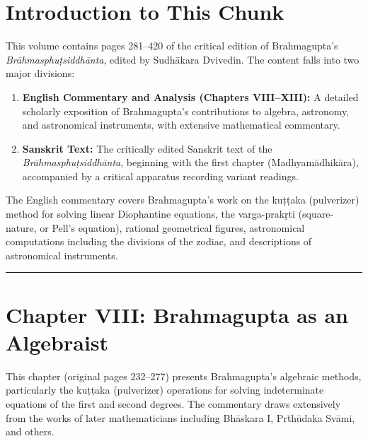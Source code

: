 \documentclass[11pt,a4paper]{article}
\newcommand{\longline}{\noindent\rule{\textwidth}{0.4pt}}
\theoremstyle{definition}
\begin{document}
\section*{Introduction to This Chunk}

This volume contains pages 281--420 of the critical edition of Brahmagupta's \textit{Br\=ahmasphu\d{t}siddh\=anta}, edited by Sudh\=akara Dvivedin. The content falls into two major divisions:

\begin{enumerate}
  \item \textbf{English Commentary and Analysis (Chapters VIII--XIII):} A detailed scholarly exposition of Brahmagupta's contributions to algebra, astronomy, and astronomical instruments, with extensive mathematical commentary.
  
  \item \textbf{Sanskrit Text:} The critically edited Sanskrit text of the \textit{Br\=ahmasphu\d{t}siddh\=anta}, beginning with the first chapter (Madhyam\=adhik\=ara), accompanied by a critical apparatus recording variant readings.
\end{enumerate}

The English commentary covers Brahmagupta's work on the ku\d{t}\d{t}aka (pulverizer) method for solving linear Diophantine equations, the varga-prak\d{r}ti (square-nature, or Pell's equation), rational geometrical figures, astronomical computations including the divisions of the zodiac, and descriptions of astronomical instruments.

\longline

\section{Chapter VIII: Brahmagupta as an Algebraist}
\label{sec:algebraist}

This chapter (original pages 232--277) presents Brahmagupta's algebraic methods, particularly the ku\d{t}\d{t}aka (pulverizer) operations for solving indeterminate equations of the first and second degrees. The commentary draws extensively from the works of later mathematicians including Bh\=askara I, Pr\=th\=udaka Sv\=ami, and others.
\end{document}
